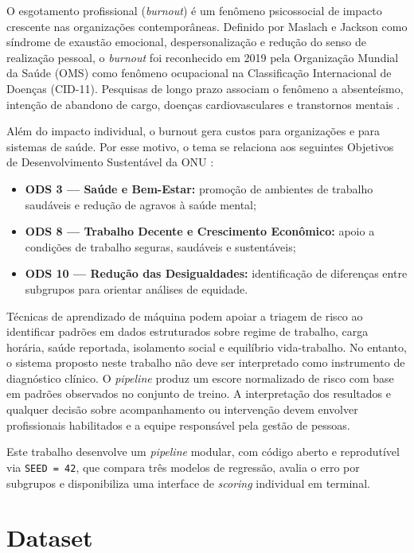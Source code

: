 \documentclass[conference]{IEEEtran}
\begin{document}
O esgotamento profissional (\textit{burnout}) é um fenômeno psicossocial de
impacto crescente nas organizações contemporâneas. Definido por Maslach e
Jackson \cite{maslach1981} como síndrome de exaustão emocional,
despersonalização e redução do senso de realização pessoal, o
\textit{burnout} foi reconhecido em 2019 pela Organização Mundial da Saúde
(OMS) como fenômeno ocupacional na Classificação Internacional de Doenças
(CID-11). Pesquisas de longo prazo associam o fenômeno a absenteísmo,
intenção de abandono de cargo, doenças cardiovasculares e transtornos
mentais \cite{salvagioni2017}.

Além do impacto individual, o burnout gera custos para organizações e para
sistemas de saúde. Por esse motivo, o tema se relaciona aos seguintes
Objetivos de Desenvolvimento Sustentável da ONU \cite{onu_ods}:

\begin{itemize}
\item \textbf{ODS 3 — Saúde e Bem-Estar:} promoção de ambientes de
trabalho saudáveis e redução de agravos à saúde mental;
\item \textbf{ODS 8 — Trabalho Decente e Crescimento Econômico:}
apoio a condições de trabalho seguras, saudáveis e sustentáveis;
\item \textbf{ODS 10 — Redução das Desigualdades:} identificação de
diferenças entre subgrupos para orientar análises de equidade.
\end{itemize}

Técnicas de aprendizado de máquina podem apoiar a triagem de risco ao
identificar padrões em dados estruturados sobre regime de trabalho, carga
horária, saúde reportada, isolamento social e equilíbrio vida-trabalho. No
entanto, o sistema proposto neste trabalho não deve ser interpretado como
instrumento de diagnóstico clínico. O \textit{pipeline} produz um escore
normalizado de risco com base em padrões observados no conjunto de treino.
A interpretação dos resultados e qualquer decisão sobre acompanhamento ou
intervenção devem envolver profissionais habilitados e a equipe responsável
pela gestão de pessoas.

Este trabalho desenvolve um \textit{pipeline} modular, com código aberto e
reprodutível via \texttt{SEED = 42}, que compara três modelos de regressão,
avalia o erro por subgrupos e disponibiliza uma interface de
\textit{scoring} individual em terminal.

\section{Dataset}
\label{sec:dataset}
\end{document}
